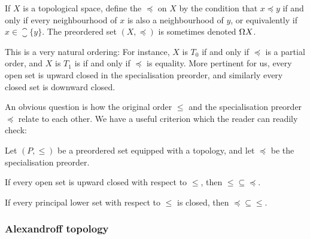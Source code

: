 If $X$ is a topological space, define the  $\preceq$ on $X$ by the condition that $x \preceq y$ if and only if every neighbourhood of $x$ is also a neighbourhood of $y$, or equivalently if $x \in \closure{\{y\}}$. The preordered set $(X,\preceq)$ is sometimes denoted $\Omega X$.

This is a very natural ordering: For instance, $X$ is $T_0$ if and only if $\preceq$ is a partial order, and $X$ is $T_1$ is if and only if $\preceq$ is equality. More pertinent for us, every open set is upward closed in the specialisation preorder, and similarly every closed set is downward closed.

An obvious question is how the original order $\leq$ and the specialisation preorder $\preceq$ relate to each other. We have a useful criterion which the reader can readily check:

\begin{lemmanoproof}
    Let $(P,\leq)$ be a preordered set equipped with a topology, and let $\preceq$ be the specialisation preorder.
    \begin{enumlemma}
        \item If every open set is upward closed with respect to $\leq$, then ${\leq} \subseteq {\preceq}$.
        \item If every principal lower set with respect to $\leq$ is closed, then ${\preceq} \subseteq {\leq}$.
    \end{enumlemma}
\end{lemmanoproof}


\subsubsection{Alexandroff topology}

